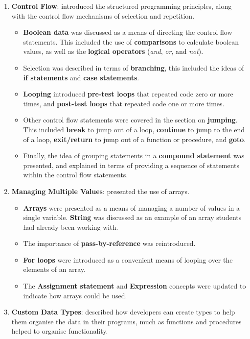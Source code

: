 \begin{enumerate}
\begin{itemize}
  \end{itemize}
  \item \textbf{Control Flow}: introduced the structured programming principles, along with the control flow mechanisms of selection and repetition.
  \begin{itemize}[noitemsep,nolistsep]
    \item \textbf{Boolean data} was discussed as a means of directing the control flow statements. This included the use of \textbf{comparisons} to calculate boolean values, as well as the \textbf{logical operators} (\emph{and}, \emph{or}, and \emph{not}).
    \item Selection was described in terms of \textbf{branching}, this included the ideas of \textbf{if statements} and \textbf{case statements}.
    \item \textbf{Looping} introduced \textbf{pre-test loops} that repeated code zero or more times, and \textbf{post-test loops} that repeated code one or more times. 
    \item Other control flow statements were covered in the section on \textbf{jumping}. This included \textbf{break} to jump out of a loop, \textbf{continue} to jump to the end of a loop, \textbf{exit/return} to jump out of a function or procedure, and \textbf{goto}.
    \item Finally, the idea of grouping statements in a \textbf{compound statement} was presented, and explained in terms of providing a sequence of statements within the control flow statements.
  \end{itemize}
  \item \textbf{Managing Multiple Values}: presented the use of arrays.
  \begin{itemize}[noitemsep,nolistsep]
    \item \textbf{Arrays} were presented as a means of managing a number of values in a single variable. \textbf{String} was discussed as an example of an array students had already been working with.
    \item The importance of \textbf{pass-by-reference} was reintroduced.
    \item \textbf{For loops} were introduced as a convenient means of looping over the elements of an array. 
    \item The \textbf{Assignment statement} and \textbf{Expression} concepts were updated to indicate how arrays could be used.
  \end{itemize}
  \item \textbf{Custom Data Types}: described how developers can create types to help them organise the data in their programs, much as functions and procedures helped to organise functionality.

\end{enumerate}
